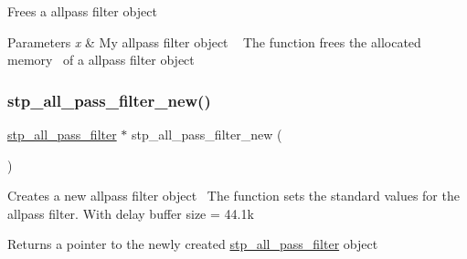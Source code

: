 Frees a allpass filter object~\newline
 


\begin{DoxyParams}{Parameters}
{\em x} & My allpass filter object ~\newline
 The function frees the allocated memory~\newline
 of a allpass filter object \\
\hline
\end{DoxyParams}
\mbox{\label{structstp__all__pass__filter_a493ebb4f85e462564b6c5d9b16d827b0}} 
\subsubsection{\texorpdfstring{stp\+\_\+all\+\_\+pass\+\_\+filter\+\_\+new()}{stp\_all\_pass\_filter\_new()}}
{\footnotesize\ttfamily \hyperlink{structstp__all__pass__filter}{stp\+\_\+all\+\_\+pass\+\_\+filter} $\ast$ stp\+\_\+all\+\_\+pass\+\_\+filter\+\_\+new (\begin{DoxyParamCaption}{ }\end{DoxyParamCaption})\hspace{0.3cm}{\ttfamily [related]}}



Creates a new allpass filter object~\newline
 The function sets the standard values for the allpass filter. With delay buffer size = 44.\+1k ~\newline
 

\begin{DoxyReturn}{Returns}
a pointer to the newly created \hyperlink{structstp__all__pass__filter}{stp\+\_\+all\+\_\+pass\+\_\+filter} object ~\newline
 
\end{DoxyReturn}
\mbox{\label{structstp__all__pass__filter_a7401c009025defdd86c122159c7fb15c}} 
